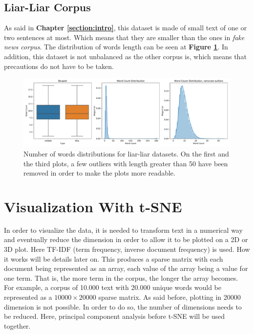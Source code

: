 \subsection{Liar-Liar Corpus}
As said in \textbf{Chapter \ref{section:intro}}, this dataset is made of small text of one or two sentences at most. Which means that they are smaller than the ones in \textit{fake news corpus}. The distribution of words length can be seen at \textbf{Figure \ref{fig:data_explo:summary3}}. In addition, this dataset is not unbalanced as the other corpus is, which means that precautions do not have to be taken. \\
\begin{figure}[h]
  \centering
  \includegraphics[width=\textwidth]{images/data_exploration/liar_liar_summary.pdf}
  \caption{Number of words distributions for liar-liar datasets. On the first and the third plots, a few outliers with length greater than 50 have been removed in order to make the plots more readable.}
  \label{fig:data_explo:summary3}
\end{figure}
\section{Visualization With t-SNE}
In order to visualize the data, it is needed to transform text in a numerical way and eventually reduce the dimension in order to allow it to be plotted on a 2D or 3D plot. Here TF-IDF (term frequency, inverse document frequency\cite{Robertson2004,Jones2004}) is used. How it works will be details later on. This produces a sparse matrix with each document being represented as an array, each value of the array being a value for one term. That is, the more term in the corpus, the longer the array becomes. For example, a corpus of 10.000 text with 20.000 unique words would be represented as a $10000 \times 20000$ sparse matrix. As said before, plotting in 20000 dimension is not possible. In order to do so, the number of dimensions needs to be reduced. Here, principal component analysis before t-SNE\cite{Maaten2008} will be used together. \\
